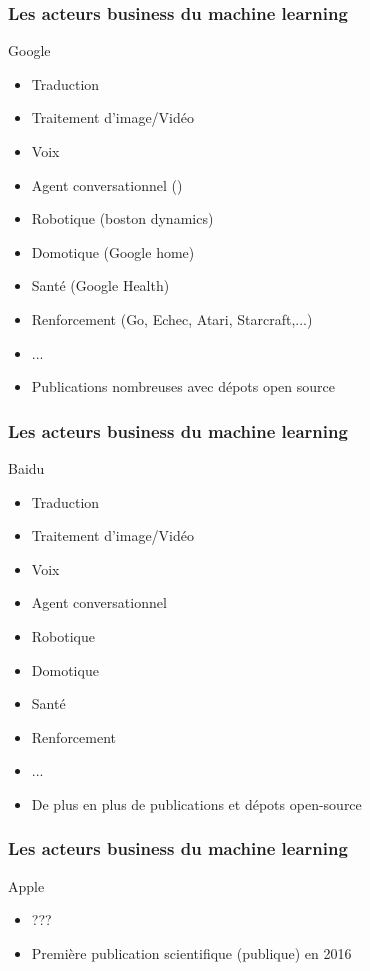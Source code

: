 \documentclass{formation}
\begin{document}
\begin{frame}
  \frametitle{Les acteurs business du machine learning}
  Google
  \begin{itemize}
  \item Traduction
  \item Traitement d'image/Vidéo
  \item Voix
  \item Agent conversationnel (\href{https://www.youtube.com/watch?v=d40jgFZ5hXk}{})
  \item Robotique (boston dynamics)
  \item Domotique (Google home)
  \item Santé (Google Health)
  \item Renforcement (Go, Echec, Atari, Starcraft,...)
  \item ...
  \item Publications nombreuses avec dépots open source
  \end{itemize}
\end{frame}

\begin{frame}
  \frametitle{Les acteurs business du machine learning}
  Baidu
  \begin{itemize}
  \item Traduction
  \item Traitement d'image/Vidéo
  \item Voix
  \item Agent conversationnel
  \item Robotique
  \item Domotique
  \item Santé
  \item Renforcement
  \item ...
  \item De plus en plus de publications et dépots open-source
  \end{itemize}
\end{frame}

\begin{frame}
  \frametitle{Les acteurs business du machine learning}
  Apple
  \begin{itemize}
  \item ???
  \item Première publication scientifique (publique) en 2016
  \end{itemize}
\end{frame}
\end{document}
